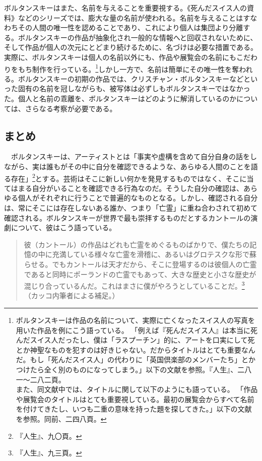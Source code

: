 \documentclass[b5j,twoside,twocolumn]{utarticle}
\begin{document}
ボルタンスキーはまた、名前を与えることを重要視する。《死んだスイス人の資料》などのシリーズでは、膨大な量の名前が使われる。名前を与えることはすなわちその人間の唯一性を認めることであり、これにより個人は集団より分離する。ボルタンスキーの作品が抽象化され一般的な情報へと回収されないために、そして作品が個人の次元にとどまり続けるために、名づけは必要な措置である。実際に、ボルタンスキーは個人の名前以外にも、作品や展覧会の名前にもこだわりをもち制作を行っている。\footnote{ボルタンスキーは作品の名前について、実際に亡くなったスイス人の写真を用いた作品を例にこう語っている。
「例えば『死んだスイス人』は本当に死んだスイス人だったし、僕は「ラスプーチン」的に、アートを口実にして死とか神聖なものを犯すのは好きじゃない。だからタイトルはとても重要なんだ。もし「死んだスイス人」の代わりに「英国倶楽部のメンバーたち」とかつけたら全く別のものになってしまう。」以下の文献を参照。『人生』、二八一～二八二頁。\\また、同文献中では、タイトルに関して以下のようにも語っている。
「作品や展覧会のタイトルはとても重要視している。最初の展覧会からすべて名前を付けてきたし、いつも二重の意味を持った題を探してきた。」以下の文献を参照。同前、二四八頁。}しかし一方で、名前は簡単にその唯一性を奪われる。ボルタンスキーの初期の作品では、クリスチャン・ボルタンスキーなどといった固有の名前を冠しながらも、被写体は必ずしもボルタンスキーではなかった。個人と名前の乖離を、ボルタンスキーはどのように解消しているのかについては、さらなる考察が必要である。

\subsection{まとめ}
　ボルタンスキーは、アーティストとは「事実や虚構を含めて自分自身の話をしながら、実は誰もがその中に自分を確認できるような、あらゆる人間のことを語る存在」\footnote{『人生』、九〇頁。}とする。芸術はそこに新しい何かを発見するものではなく、そこに当てはまる自分がいることを確認できる行為なのだ。そうした自分の確認は、あらゆる個人がそれぞれに行うことで普遍的なものとなる。しかし、確認される自分は、常にそこには存在しないある誰か、つまり「亡霊」に重ね合わされて初めて確認される。ボルタンスキーが世界で最も崇拝するものだとするカントールの演劇について、彼はこう語っている。
\begin{quote}
彼（カントール）の作品はどれも亡霊をめぐるものばかりで、僕たちの記憶の中に充満している様々な亡霊を滑稽に、あるいはグロテスクな形で蘇らせる。でもカントールは天才だから、そこに登場するのは彼個人の亡霊であると同時にポーランドの亡霊でもあって、大きな歴史と小さな歴史が混じり合っているんだ。これはまさに僕がやろうとしていることだ。\footnote{『人生』、九三頁。}（カッコ内筆者による補足。） 
\end{quote}
\end{document}

